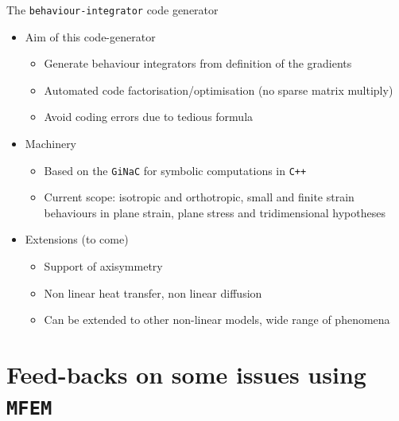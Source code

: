 \documentclass{beamer}
\begin{document}
\begin{frame}[fragile]{The
    \texttt{behaviour-integrator} code
    generator}
  \begin{itemize}
    \item Aim of this code-generator
    \begin{itemize}
      \item Generate behaviour integrators from definition of the gradients
      \item Automated code factorisation/optimisation (no sparse matrix multiply)
      \item Avoid coding errors due to tedious formula
    \end{itemize}
    \item Machinery
    \begin{itemize}
      \item Based on the \texttt{GiNaC} for symbolic
      computations in \texttt{C++}
      \item Current scope: isotropic and orthotropic, small
      and finite strain behaviours in plane strain, plane stress and
      tridimensional hypotheses
    \end{itemize}
    \item Extensions (to come)
    \begin{itemize}
      \item Support of axisymmetry
      \item Non linear heat transfer, non linear diffusion
      \item Can be extended to other non-linear models, wide
      range of phenomena
    \end{itemize}
  \end{itemize}
\end{frame}

\section{Feed-backs on some issues using {\tt MFEM}}
\end{document}
